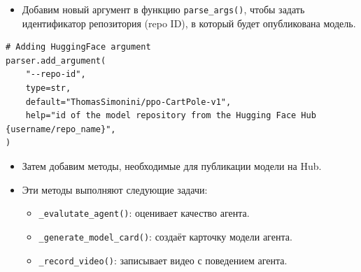 \documentclass[11pt,a4paper]{article}
\begin{document}
\begin{itemize}
\tightlist
\item
  Добавим новый аргумент в функцию \texttt{parse\_args()}, чтобы задать идентификатор репозитория (repo ID), в который будет опубликована модель.
\end{itemize}

\begin{lstlisting}
# Adding HuggingFace argument
parser.add_argument(
    "--repo-id",
    type=str,
    default="ThomasSimonini/ppo-CartPole-v1",
    help="id of the model repository from the Hugging Face Hub {username/repo_name}",
)
\end{lstlisting}

\begin{itemize}
\item
  Затем добавим методы, необходимые для публикации модели на Hub.
\item
  Эти методы выполняют следующие задачи:

  \begin{itemize}
  \tightlist
  \item
    \texttt{\_evalutate\_agent()}: оценивает качество агента.
  \item
    \texttt{\_generate\_model\_card()}: создаёт карточку модели агента.
  \item
    \texttt{\_record\_video()}: записывает видео с поведением агента.
  \end{itemize}
\end{itemize}
\end{document}
